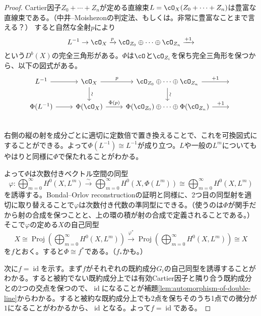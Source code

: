 \documentclass[uplatex, a4paper, dvipdfmx]{jsarticle}
\theoremstyle{definition}
\DeclareMathOperator{\id}{\mathrm{id}}
\DeclareMathOperator{\Proj}{\mathrm{Proj}}
\begin{document}
\begin{proof}
    Cartier因子$Z_0 + \cdots + Z_n$が定める直線束$L = \cO_X(Z_0 + \cdots + Z_n)$は豊富な直線束である。（中井--Moishezonの判定法、もしくは\cite[Proposition 1.2.16]{MR2095471}。非常に豊富なことまで言える？）
    すると自然な全射$p$により
    \begin{equation}\label{eq:exact-triangle-of-very-ample-line-bundle}
        L^{-1} \to \cO_X \xrightarrow{p} \cO_{Z_0} \oplus \cdots \oplus \cO_{Z_n}\xrightarrow{+1}
    \end{equation}
    という$D^b(X)$の完全三角形がある。$\Phi$は$\cO$と$\cO_{Z_i}$を保ち完全三角形を保つから、以下の図式がある。
    \[
        \begin{tikzcd}
            L^{-1} \ar[r] & \cO_X \ar[r, "p"] \ar[d, "\sim", sloped] & \cO_{Z_0} \oplus \cdots \oplus \cO_{Z_n} \ar[r, "+1"]\ar[d, "\sim", sloped] &{}\\
            \Phi(L^{-1}) \ar[r] & \Phi(\cO_X) \ar[r, "\Phi(p)"] & \Phi(\cO_{Z_0}) \oplus \cdots \oplus \Phi(\cO_{Z_n}) \ar[r, "+1"] &{}\\
        \end{tikzcd}
    \]
    右側の縦の射を成分ごとに適切に定数倍で置き換えることで、これを可換図式にすることができる。よって$\Phi(L^{-1}) \cong L^{-1}$が成り立つ。$L$や一般の$L^m$についてもやはり\cite{MR3182005}と同様に$\Phi$で保たれることがわかる。

    よって$\Phi$は次数付きベクトル空間の同型
    \begin{equation}
        \varphi \colon \bigoplus_{m = 0}^\infty H^0(X, L^m) \xrightarrow{\sim} \bigoplus_{m = 0}^\infty H^0(X, \Phi(L^m)) \cong \bigoplus_{m = 0}^\infty H^0(X, L^m)
    \end{equation}
    を誘導する。Bondal--Orlov reconstructionの証明\cite{MR1818984}と同様に、2つ目の同型射を適切に取り替えることで$\varphi$は次数付き代数の準同型にできる。（使うのは$\Phi$が関手だから射の合成を保つことと、上の環の積が射の合成で定義されることである。）そこで$\varphi$の定める$X$の自己同型
    \begin{equation}
        X \cong \Proj(\bigoplus_{m = 0}^\infty H^0(X, L^m)) \xrightarrow{\varphi^*} \Proj(\bigoplus_{m = 0}^\infty H^0(X, L^m)) \cong X
    \end{equation}
    を$f$とおく。すると$\Phi \cong f^*$である。（$f_*$かも。）

    次に$f = \id$を示す。まず$f$がそれぞれの既約成分$G_i$の自己同型を誘導することがわかる。すると被約でない既約成分上では有効Cartier因子と隣り合う既約成分との2つの交点を保つので、$\id$になることが補題\ref{lem:automorphism-of-double-line}からわかる。すると被約な既約成分上でも2点を保ちそのうち1点での微分が$1$になることがわかるから、$\id$となる。よって$f = \id$である。
\end{proof}
\end{document}
